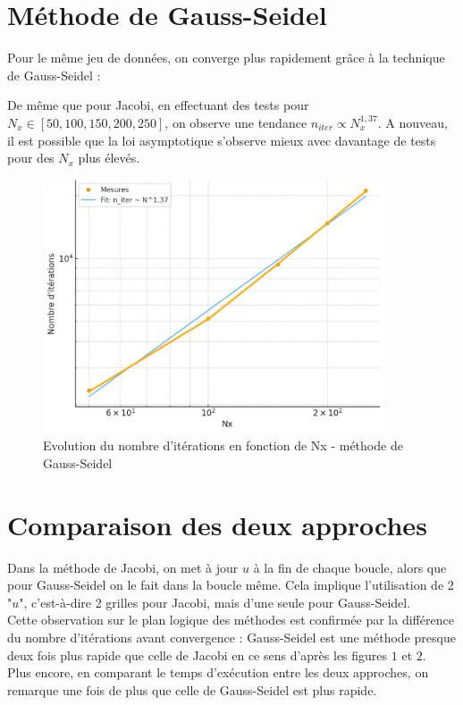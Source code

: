 \documentclass{article}
\begin{document}
\section{Méthode de Gauss-Seidel}
Pour le même jeu de données, on converge plus rapidement grâce à la technique de Gauss-Seidel :


De même que pour Jacobi, en effectuant des tests  pour $N_x \in [50,100,150,200,250]$, on observe une tendance $n_{iter} \propto N_x^{1,37}$. A nouveau, il est possible que la loi asymptotique s'observe mieux avec davantage de tests pour des $N_x$ plus élevés.

\begin{figure}[H]
    \centering
    \includegraphics[width=0.9\textwidth]{courbe_log_log_gs.png}
    \caption{Evolution du nombre d'itérations en fonction de Nx - méthode de Gauss-Seidel}
    \label{fig:placeholder}
\end{figure}

\section{Comparaison des deux approches}
Dans la méthode de Jacobi, on met à jour $u$ à la fin de chaque boucle, alors que pour Gauss-Seidel on le fait dans la boucle même. Cela implique l'utilisation de 2 "$u$", c'est-à-dire 2 grilles pour Jacobi, mais d'une seule pour Gauss-Seidel.\\
Cette observation sur le plan logique des méthodes est confirmée par la différence du nombre d'itérations avant convergence : Gauss-Seidel est une méthode presque deux fois plus rapide que celle de Jacobi en ce sens d'après les figures $1$ et $2$. \\
Plus encore, en comparant le temps d'exécution entre les deux approches, on remarque une fois de plus que celle de Gauss-Seidel est plus rapide.
\end{document}
